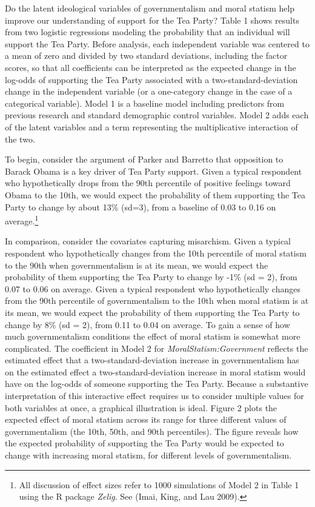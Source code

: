 \documentclass[12pt,]{article}
\let\rmarkdownfootnote\footnote%
\def\footnote{\protect\rmarkdownfootnote}
\begin{document}
Do the latent ideological variables of governmentalism and moral statism
help improve our understanding of support for the Tea Party? Table 1
shows results from two logistic regressions modeling the probability
that an individual will support the Tea Party. Before analysis, each
independent variable was centered to a mean of zero and divided by two
standard deviations, including the factor scores, so that all
coefficients can be interpreted as the expected change in the log-odds
of supporting the Tea Party associated with a two-standard-deviation
change in the independent variable (or a one-category change in the case
of a categorical variable). Model 1 is a baseline model including
predictors from previous research and standard demographic control
variables. Model 2 adds each of the latent variables and a term
representing the multiplicative interaction of the two.

To begin, consider the argument of Parker and Barretto that opposition
to Barack Obama is a key driver of Tea Party support. Given a typical
respondent who hypothetically drops from the 90th percentile of positive
feelings toward Obama to the 10th, we would expect the probability of
them supporting the Tea Party to change by about 13\% (sd=3), from a
baseline of 0.03 to 0.16 on average.\footnote{All discussion of effect
  sizes refer to 1000 simulations of Model 2 in Table 1 using the R
  package \emph{Zelig}. See (Imai, King, and Lau 2009).}

In comparison, consider the covariates capturing misarchism. Given a
typical respondent who hypothetically changes from the 10th percentile
of moral statism to the 90th when governmentalism is at its mean, we
would expect the probability of them supporting the Tea Party to change
by -1\% (sd = 2), from 0.07 to 0.06 on average. Given a typical
respondent who hypothetically changes from the 90th percentile of
governmentalism to the 10th when moral statism is at its mean, we would
expect the probability of them supporting the Tea Party to change by 8\%
(sd = 2), from 0.11 to 0.04 on average. To gain a sense of how much
governmentalism conditions the effect of moral statism is somewhat more
complicated. The coefficient in Model 2 for
\emph{MoralStatism:Government} reflects the estimated effect that a
two-standard-deviation increase in governmentalism has on the estimated
effect a two-standard-deviation increase in moral statism would have on
the log-odds of someone supporting the Tea Party. Because a substantive
interpretation of this interactive effect requires us to consider
multiple values for both variables at once, a graphical illustration is
ideal. Figure 2 plots the expected effect of moral statism across its
range for three different values of governmentalism (the 10th, 50th, and
90th percentiles). The figure reveals how the expected probability of
supporting the Tea Party would be expected to change with increasing
moral statism, for different levels of governmentalism.
\end{document}
